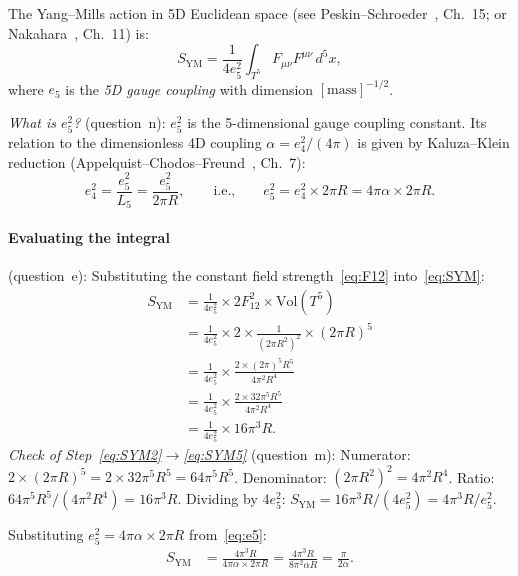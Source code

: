\documentclass[11pt,a4paper]{article}
\theoremstyle{definition}
\theoremstyle{remark}
\begin{document}
The Yang--Mills action in 5D Euclidean space
(see Peskin--Schroeder~\cite{PeskinSchroeder1995}, Ch.~15;
or Nakahara~\cite{Nakahara2003}, Ch.~11) is:
\begin{equation}\label{eq:SYM}
  S_{\mathrm{YM}} = \frac{1}{4 e_5^2} \int_{T^5}
  F_{\mu\nu}F^{\mu\nu}\,d^5x,
\end{equation}
where $e_5$ is the \emph{5D gauge coupling} with dimension
$[\mathrm{mass}]^{-1/2}$.

\emph{What is $e_5^2$?} (question~n):
$e_5^2$ is the 5-dimensional gauge coupling constant.
Its relation to the dimensionless 4D coupling $\alpha = e_4^2/(4\pi)$
is given by Kaluza--Klein reduction
(Appelquist--Chodos--Freund~\cite{Appelquist1987}, Ch.~7):
\begin{equation}\label{eq:e5}
  e_4^2 = \frac{e_5^2}{L_5} = \frac{e_5^2}{2\pi R},
  \qquad\text{i.e.,}\qquad
  e_5^2 = e_4^2 \times 2\pi R = 4\pi\alpha \times 2\pi R.
\end{equation}

\paragraph{Evaluating the integral} (question~e):
Substituting the constant field strength~\eqref{eq:F12} into~\eqref{eq:SYM}:
\begin{align}
  S_{\mathrm{YM}}
  &= \frac{1}{4 e_5^2} \times 2 F_{12}^2 \times \mathrm{Vol}(T^5)
  \label{eq:SYM1}\\
  &= \frac{1}{4 e_5^2} \times 2 \times \frac{1}{(2\pi R^2)^2}
     \times (2\pi R)^5
  \label{eq:SYM2}\\
  &= \frac{1}{4 e_5^2} \times \frac{2 \times (2\pi)^5 R^5}
     {4\pi^2 R^4}
  \label{eq:SYM3}\\
  &= \frac{1}{4 e_5^2} \times \frac{2 \times 32\pi^5 R^5}
     {4\pi^2 R^4}
  \label{eq:SYM4}\\
  &= \frac{1}{4 e_5^2} \times 16\pi^3 R.
  \label{eq:SYM5}
\end{align}
\emph{Check of Step~\eqref{eq:SYM2}$\to$\eqref{eq:SYM5}} (question~m):
Numerator: $2 \times (2\pi R)^5 = 2 \times 32\pi^5 R^5 = 64\pi^5 R^5$.
Denominator: $(2\pi R^2)^2 = 4\pi^2 R^4$.
Ratio: $64\pi^5 R^5 / (4\pi^2 R^4) = 16\pi^3 R$.
Dividing by $4 e_5^2$: $S_{\mathrm{YM}} = 16\pi^3 R / (4 e_5^2) = 4\pi^3 R / e_5^2$.

Substituting $e_5^2 = 4\pi\alpha \times 2\pi R$ from~\eqref{eq:e5}:
\begin{align}
  S_{\mathrm{YM}}
  &= \frac{4\pi^3 R}{4\pi\alpha \times 2\pi R}
  = \frac{4\pi^3 R}{8\pi^2 \alpha R}
  = \frac{\pi}{2\alpha}.
  \label{eq:S0half}
\end{align}
\end{document}
